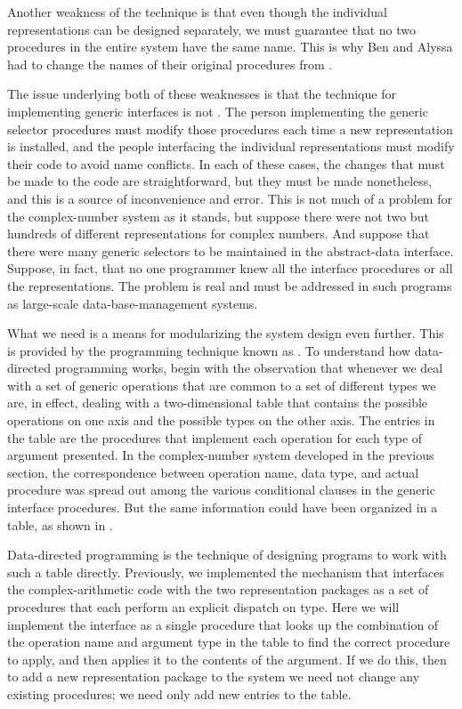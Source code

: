 Another weakness of the technique is that even though the individual representations can be designed separately, we must guarantee that no two procedures in the entire system have the same name.
This is why Ben and Alyssa had to change the names of their original procedures from .

The issue underlying both of these weaknesses is that the technique for implementing generic interfaces is not .
The person implementing the generic selector procedures must modify those procedures each time a new representation is installed, and the people interfacing the individual representations must modify their code to avoid name conflicts.
In each of these cases, the changes that must be made to the code are straightforward, but they must be made nonetheless, and this is a source of inconvenience and error.
This is not much of a problem for the complex-number system as it stands, but suppose there were not two but hundreds of different representations for complex numbers.
And suppose that there were many generic selectors to be maintained in the abstract-data interface.
Suppose, in fact, that no one programmer knew all the interface procedures or all the representations.
The problem is real and must be addressed in such programs as large-scale data-base-management systems.

What we need is a means for modularizing the system design even further.
This is provided by the programming technique known as .
To understand how data-directed programming works, begin with the observation that whenever we deal with a set of generic operations that are common to a set of different types we are, in effect, dealing with a two-dimensional table that contains the possible operations on one axis and the possible types on the other axis.
The entries in the table are the procedures that implement each operation for each type of argument presented.
In the complex-number system developed in the previous section, the correspondence between operation name, data type, and actual procedure was spread out among the various conditional clauses in the generic interface procedures.
But the same information could have been organized in a table, as shown in .

Data-directed programming is the technique of designing programs to work with such a table directly.
Previously, we implemented the mechanism that interfaces the complex-arithmetic code with the two representation packages as a set of procedures that each perform an explicit dispatch on type.
Here we will implement the interface as a single procedure that looks up the combination of the operation name and argument type in the table to find the correct procedure to apply, and then applies it to the contents of the argument.
If we do this, then to add a new representation package to the system we need not change any existing procedures;
we need only add new entries to the table.

